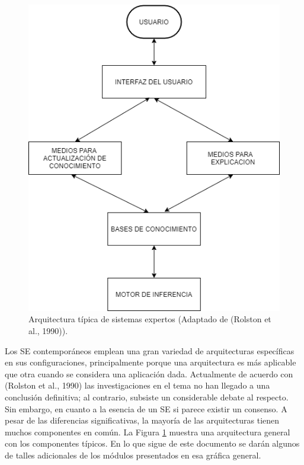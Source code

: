 \begin{figure}[H]
\centering
\captionsetup{justification=centering,margin=2cm}
\includegraphics[scale=0.4]{chapters/chapter10/figures/1-1.png}
\caption{Arquitectura típica de sistemas expertos (Adaptado de (Rolston et al., 1990)).}
\label{fig:10-1}
\end{figure}

Los SE contemporáneos emplean una gran variedad de arquitecturas específicas en sus configuraciones, principalmente porque una arquitectura es más aplicable que otra cuando se considera una aplicación dada. Actualmente de acuerdo con (Rolston et al., 1990) las investigaciones en el tema no han llegado a una conclusión definitiva; al contrario, subsiste un considerable debate al respecto.\\
Sin embargo, en cuanto a la esencia de un SE si parece existir un consenso.  A pesar de las diferencias significativas, la mayoría de las arquitecturas tienen muchos componentes en común. La Figura \ref{fig:10-1} muestra una arquitectura general con los componentes típicos. En lo que sigue de este documento se darán algunos de talles adicionales de los módulos presentados en esa gráfica general.\\
